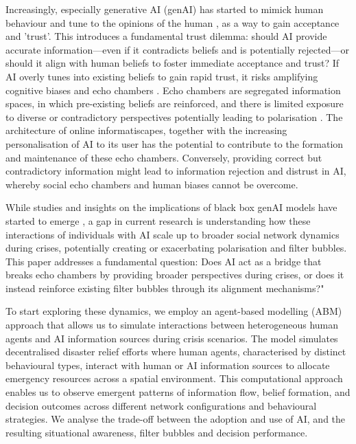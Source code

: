 \documentclass[pdflatex,sn-apa]{sn-jnl}%
\begin{document}
Increasingly, especially generative AI (genAI) has started to mimick human behaviour and tune to the opinions of the human \citep{sharma2024generative}, as a way to gain acceptance and 'trust'. This introduces a fundamental trust dilemma: should AI provide accurate information—even if it contradicts beliefs and is potentially rejected—or should it align with human beliefs to foster immediate acceptance and trust? If AI overly tunes into existing beliefs to gain rapid trust, it risks amplifying cognitive biases and echo chambers \citep{ekstrom2022self}. Echo chambers are segregated information spaces, in which pre-existing beliefs are reinforced, and there is limited exposure to diverse or contradictory perspectives potentially leading to polarisation \citep{jeon2024hearhere}. The architecture of online informatiscapes, together with the increasing personalisation of AI to its user has the potential to contribute to the formation and maintenance of these echo chambers. Conversely, providing correct but contradictory information might lead to information rejection and distrust in AI, whereby social echo chambers and human biases cannot be overcome.

While studies and insights on the implications of black box genAI models have started to emerge \citep{zhang2024see, sharma2024generative}, a gap in current research is understanding how these interactions of individuals with AI scale up to broader social network dynamics during crises, potentially creating or exacerbating polarisation and filter bubbles. This paper addresses a fundamental question: Does AI act as a bridge that breaks echo chambers by providing broader perspectives during crises, or does it instead reinforce existing filter bubbles through its alignment mechanisms?"

To start exploring these dynamics, we employ an agent-based modelling (ABM) approach that allows us to simulate interactions between heterogeneous human agents and AI information sources during crisis scenarios. The model simulates decentralised disaster relief efforts where human agents, characterised by distinct behavioural types, interact with human or AI information sources to allocate emergency resources across a spatial environment. This computational approach enables us to observe emergent patterns of information flow, belief formation, and decision outcomes across different network configurations and behavioural strategies. We analyse the trade-off between the adoption and use of AI, and the resulting situational awareness, filter bubbles and decision performance. 
\end{document}
